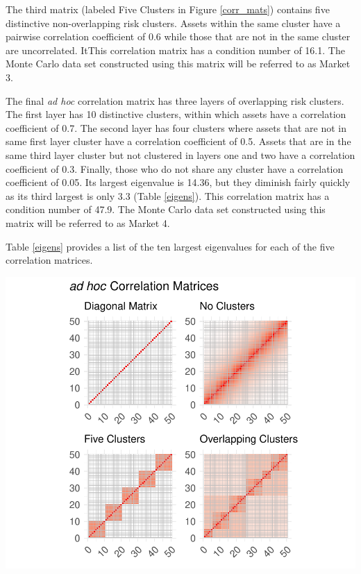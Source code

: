 \documentclass[11pt,preprint, authoryear]{elsarticle}
\let\origfigure\figure
\let\endorigfigure\endfigure
\renewenvironment{figure}[1][2] {
    \expandafter\origfigure\expandafter[H]
} {
    \endorigfigure
}
\numberwithin{equation}{section}
\numberwithin{figure}{section}
\numberwithin{table}{section}
\begin{document}
The third matrix (labeled Five Clusters in Figure \ref{corr_mats})
contains five distinctive non-overlapping risk clusters. Assets within
the same cluster have a pairwise correlation coefficient of 0.6 while
those that are not in the same cluster are uncorrelated. ItThis
correlation matrix has a condition number of 16.1. The Monte Carlo data
set constructed using this matrix will be referred to as Market 3.

The final \emph{ad hoc} correlation matrix has three layers of
overlapping risk clusters. The first layer has 10 distinctive clusters,
within which assets have a correlation coefficient of 0.7. The second
layer has four clusters where assets that are not in same first layer
cluster have a correlation coefficient of 0.5. Assets that are in the
same third layer cluster but not clustered in layers one and two have a
correlation coefficient of 0.3. Finally, those who do not share any
cluster have a correlation coefficient of 0.05. Its largest eigenvalue
is 14.36, but they diminish fairly quickly as its third largest is only
3.3 (Table \ref{eigens}). This correlation matrix has a condition number
of 47.9. The Monte Carlo data set constructed using this matrix will be
referred to as Market 4.

Table \ref{eigens} provides a list of the ten largest eigenvalues for
each of the five correlation matrices.

\begin{figure}
\centering
\includegraphics{Thesis_files/figure-latex/corr mats-1.pdf}
\caption{\label{corr_mats} Correlation Matricies}
\end{figure}
\end{document}
